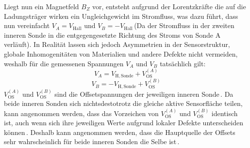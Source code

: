 \documentclass[12pt, a4paper]{article}
\begin{document}
Liegt nun ein Magnetfeld $B_Z$ vor, entsteht aufgrund der Lorentzkräfte die auf die Ladungsträger wirken ein Ungleichgewicht im Stromfluss, was dazu führt, dass nun vereinfacht $V_A=V_\mathrm{Hall}$ und $V_B=-V_\mathrm{Hall}$\,(Da der Stromfluss in der zweiten inneren Sonde in die entgegengesetzte Richtung des Stroms von Sonde A verläuft).\newline
In Realität lassen sich jedoch Asymmetrien in der Sensorstruktur, globale Inhomogenitäten von Materialien und andere Defekte nicht vermeiden, weshalb für die gemessenen Spannungen $V_A$ und $V_B$ tatsächlich gilt:
\begin{equation}
	V_A=V_\mathrm{H,Sonde}+V_\mathrm{OS}^{(A)}
	\label{eq:1}
\end{equation}
\begin{equation}
	V_B=-V_\mathrm{H,Sonde}+V_\mathrm{OS}^{(B)}
	\label{eq:2}
\end{equation}
$V_\mathrm{OS}^{(A)}$ und $V_\mathrm{OS}^{(B)}$ sind die Offsetspannungen der jeweiligen inneren Sonde\,\cite{cres20}.\newline
Da beide inneren Sonden sich nichtsdestotrotz die gleiche aktive Sensorfläche teilen, kann angenommen werden, dass das Vorzeichen von $V_\mathrm{OS}^{(A)}$ und $V_\mathrm{OS}^{(B)}$ identisch ist, auch wenn sich ihre jeweiligen Werte aufgrund lokaler Defekte unterscheiden können\,\cite{cres21}. Deshalb kann angenommen werden, dass die Hauptquelle der Offsets sehr wahrscheinlich für beide inneren Sonden die Selbe ist\,\cite{cres20}.\newline
\end{document}

